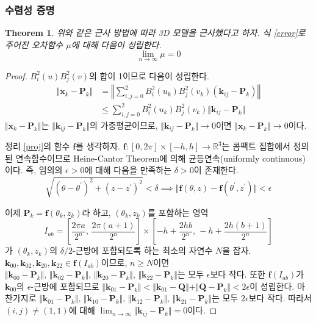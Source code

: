 \documentclass{gshs_thesis}
\theoremstyle{theorem}
\newtheorem{theorem}{Theorem}[section]
\theoremstyle{lemma}
\theoremstyle{definition}
\begin{document}
\subsubsection{수렴성 증명}
\begin{theorem} \label{thm}
	위와 같은 근사 방법에 따라 3D 모델을 근사했다고 하자. 식 \eqref{error}로 주어진 오차함수 $\mu$에 대해 다음이 성립한다.
	\begin{equation*}
		\lim_{n\to\infty}\mu=0
	\end{equation*}
\end{theorem} 
\begin{proof}
	$B_i^2(u) B_j^2(v)$의 합이 1이므로 다음이 성립한다.
	\begin{align*}
		\Vert \mathbf{x}_k - \mathbf{P}_k \Vert &= \left\Vert \sum_{i, j = 0}^2 B_i^2(u_k) B_j^2(v_k) (\mathbf{k}_{ij} - \mathbf{P}_k) \right\Vert \\
		&\leq \sum_{i, j = 0}^2 B_i^2(u_k) B_j^2(v_k) \Vert \mathbf{k}_{ij} - \mathbf{P}_k \Vert 
	\end{align*}
	$\Vert \mathbf{x}_k - \mathbf{P}_k \Vert$는 $\Vert \mathbf{k}_{ij} - \mathbf{P}_k \Vert$의 가중평균이므로, $\Vert \mathbf{k}_{ij} - \mathbf{P}_k \Vert \to 0$이면 $\Vert \mathbf{x}_k - \mathbf{P}_k \Vert \to 0$이다. 
	
	정리 \ref{proj}의 함수 $\mathbf{f}$를 생각하자. $\mathbf{f} \colon [0, 2\pi] \times [-h, h] \to \mathbb{R}^3$는 콤팩트 집합에서 정의된 연속함수이므로 Heine-Cantor Theorem에 의해 균등연속(uniformly continuous)이다. 즉, 임의의 $\epsilon > 0$에 대해 다음을 만족하는 $\delta > 0$이 존재한다. 
	$$ \sqrt{(\theta - \theta^\prime)^2 + (z - z^\prime)^2} < \delta \implies \Vert \mathbf{f}(\theta, z) - \mathbf{f}(\theta^\prime, z^\prime) \Vert < \epsilon $$
	
	이제 $\mathbf{P}_k = \mathbf{f}(\theta_k, z_k)$라 하고, $(\theta_k, z_k)$를 포함하는 영역 $$ I_{ab} = \left[ \frac{2\pi a}{2^n}, \, \frac{2\pi(a+1)}{2^n}\right] \times \left[ -h + \frac{2hb}{2^n}, \, -h + \frac{2h(b+1)}{2^n} \right] $$가 $(\theta_k, z_k)$의 $\delta/2$-근방에 포함되도록 하는 최소의 자연수 $N$을 잡자. $\mathbf{k}_{00}, \mathbf{k}_{02}, \mathbf{k}_{20}, \mathbf{k}_{22} \in \mathbf{f}(I_{ab})$이므로, $n \geq N$이면 $\Vert \mathbf{k}_{00} - \mathbf{P}_k \Vert, \, \Vert \mathbf{k}_{02} - \mathbf{P}_k \Vert, \, \Vert \mathbf{k}_{20} - \mathbf{P}_k \Vert, \, \Vert \mathbf{k}_{22} - \mathbf{P}_k \Vert$는 모두 $\epsilon$보다 작다. 또한 $\mathbf{f}(I_{ab})$가 $\mathbf{k}_{00}$의 $\epsilon$-근방에 포함되므로 $\Vert \mathbf{k}_{01} - \mathbf{P}_k \Vert < \Vert \mathbf{k}_{01} - \mathbf{Q} \Vert + \Vert \mathbf{Q} - \mathbf{P}_k \Vert < 2\epsilon$이 성립한다. 마찬가지로 $\Vert \mathbf{k}_{01} - \mathbf{P}_k \Vert, \, \Vert \mathbf{k}_{10} - \mathbf{P}_k \Vert, \, \Vert \mathbf{k}_{12} - \mathbf{P}_k \Vert, \, \Vert \mathbf{k}_{21} - \mathbf{P}_k \Vert$는 모두 $2\epsilon$보다 작다. 따라서 $(i, j) \neq (1, 1)$에 대해 $\lim_{n \to \infty} \Vert \mathbf{k}_{ij} - \mathbf{P}_k \Vert = 0$이다. 
	

\end{proof}
\end{document}
